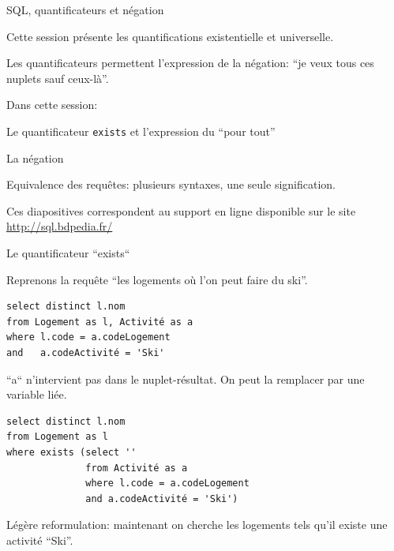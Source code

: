 
\begin{frame}[fragile]{SQL, quantificateurs et négation}

Cette session présente les quantifications 
\alert{existentielle} et \alert{universelle}.

\vfill

Les quantificateurs permettent l'expression de la négation: ``je veux tous ces nuplets \alert{sauf} ceux-là''.

\vfill
Dans cette session:
\vfill

\begin{redbullet}
  \item Le quantificateur \texttt{exists} et l'expression du ``pour tout''
  \item La négation
  \item Equivalence des requêtes: plusieurs syntaxes, une seule signification.
\end{redbullet}

\vfill
\begin{blocgauche}
\alert{Ces diapositives correspondent au support en ligne disponible sur
le site \url{http://sql.bdpedia.fr/}}
\end{blocgauche}

\end{frame}

\begin{frame}[fragile]{Le quantificateur ``exists``}

Reprenons la requête ``les logements où l’on peut faire du ski''.

\begin{verbatim}
select distinct l.nom
from Logement as l, Activité as a
where l.code = a.codeLogement
and   a.codeActivité = 'Ski'
\end{verbatim}

\vfill

``a``  n'intervient pas dans le nuplet-résultat. 
On peut la remplacer par une variable liée.


\begin{verbatim}
select distinct l.nom
from Logement as l
where exists (select ''
              from Activité as a
              where l.code = a.codeLogement
              and a.codeActivité = 'Ski')
\end{verbatim}


\vfill
\begin{blocgauche}
Légère reformulation: maintenant on cherche les logements
tels \alert{qu'il existe} une activité ``Ski''.
\end{blocgauche}
\end{frame}

